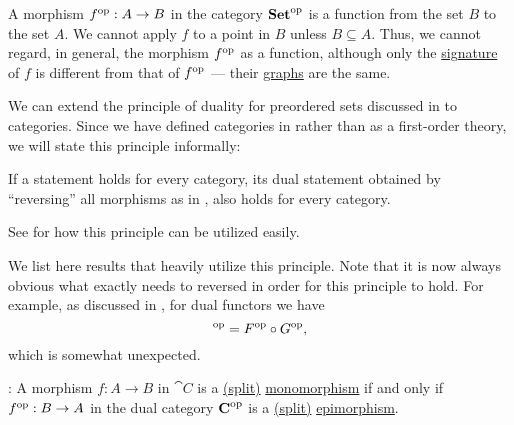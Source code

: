\begin{example}\label{ex:def:dual_category}
  A morphism \( f^{\operatorname{op}}: A \to B \) in the category \( \operatorname{\mathbf{Set}}^{\operatorname{op}} \) is a function from the set \( B \) to the set \( A \). We cannot apply \( f \) to a point in \( B \) unless \( B \subseteq A \). Thus, we cannot regard, in general, the morphism \( f^{\operatorname{op}} \) as a function, although only the \hyperref[def:multi_valued_function]{signature} of \( f \) is different from that of \( f^{\operatorname{op}} \) --- their \hyperref[def:multi_valued_function/graph]{graphs} are the same.
\end{example}

\begin{proposition}\label{thm:categorical_principle_of_duality}
  We can extend the principle of duality for preordered sets discussed in  to categories. Since we have defined categories in \hyperref[def:axiom_of_universes]{} rather than as a first-order theory, we will state this principle informally:
  \begin{displayquote}
    If a statement holds for every category, its dual statement obtained by \enquote{reversing} all morphisms as in , also holds for every category.
  \end{displayquote}

  See  for how this principle can be utilized easily.

  We list here results that heavily utilize this principle. Note that it is now always obvious what exactly needs to reversed in order for this principle to hold. For example, as discussed in , for dual functors we have
  \begin{equation*}
    [F \bincirc G]^{\opcat} = F^{\opcat} \bincirc G^{\opcat},
  \end{equation*}
  which is somewhat unexpected.

  \begin{thmenum}
     : A morphism \( f: A \to B \) in \( \cat{C} \) is a \hyperref[def:morphism_invertibility/left_invertible]{(split)} \hyperref[def:morphism_invertibility/left_cancellative]{monomorphism} if and only if \( f^{\operatorname{op}}: B \to A \) in the dual category \( \operatorname{\mathbf{C}}^{\operatorname{op}} \) is a \hyperref[def:morphism_invertibility/right_invertible]{(split)} \hyperref[def:morphism_invertibility/right_cancellative]{epimorphism}.


\end{thmenum}
\end{proposition}
